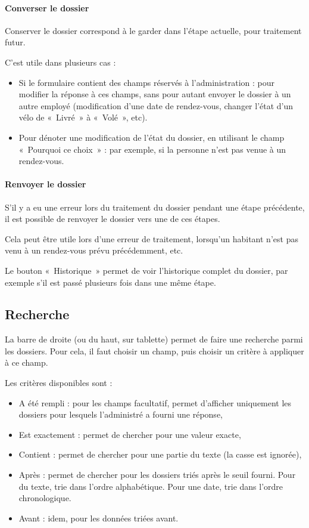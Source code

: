\documentclass[11pt,french]{memoir}
\begin{document}
	\paragraph{Converser le dossier}
	Conserver le dossier correspond à le garder dans l'étape actuelle, pour traitement futur.

	C'est utile dans plusieurs cas :
	\begin{itemize}
		\item Si le formulaire contient des champs réservés à l'administration : pour modifier la réponse à ces champs, sans pour autant envoyer le dossier à un autre employé (modification d'une date de rendez-vous, changer l'état d'un vélo de «~Livré~» à «~Volé~», etc).
		\item Pour dénoter une modification de l'état du dossier, en utilisant le champ «~Pourquoi ce choix~» : par exemple, si la personne n'est pas venue à un rendez-vous.
	\end{itemize}

	\paragraph{Renvoyer le dossier}
	S'il y a eu une erreur lors du traitement du dossier pendant une étape précédente, il est possible de renvoyer le dossier vers une de ces étapes.

	Cela peut être utile lors d'une erreur de traitement, lorsqu'un habitant n'est pas venu à un rendez-vous prévu précédemment, etc.

	\uparagraph
	Le bouton «~Historique~» permet de voir l'historique complet du dossier, par exemple s'il est passé plusieurs fois dans une même étape.

	\subsection{Recherche}\label{subsec:recherche}

	La barre de droite (ou du haut, sur tablette) permet de faire une recherche parmi les dossiers.
	Pour cela, il faut choisir un champ, puis choisir un critère à appliquer à ce champ.

	Les critères disponibles sont :
	\begin{itemize}
		\item A été rempli : pour les champs facultatif, permet d'afficher uniquement les dossiers pour lesquels l'administré a fourni une réponse,
		\item Est exactement : permet de chercher pour une valeur exacte,
		\item Contient : permet de chercher pour une partie du texte (la casse est ignorée),
		\item Après : permet de chercher pour les dossiers triés après le seuil fourni.
		Pour du texte, trie dans l'ordre alphabétique.
		Pour une date, trie dans l'ordre chronologique.
		\item Avant : idem, pour les données triées avant.
	\end{itemize}
\end{document}
